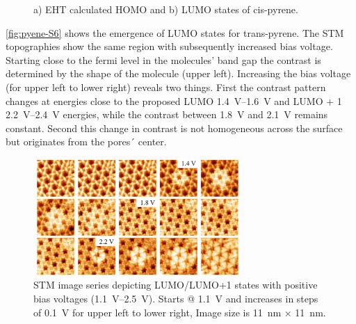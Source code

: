 \begin{figure}[]\centering
	\caption{a) EHT calculated HOMO and b) LUMO states of cis-pyrene.}
	\label{fig:pyene-S5}
\end{figure}

\autoref{fig:pyene-S6} shows the emergence of LUMO states for trans-pyrene. The STM topographies show the same region with subsequently increased bias voltage. Starting close to the fermi level in the molecules’ band gap the contrast is determined by the shape of the molecule (upper left). Increasing the bias voltage (for upper left to lower right) reveals two things. First the contrast pattern changes at energies close to the proposed LUMO \SIrange{1.4}{1.6}{\volt} and LUMO + 1 \SIrange{2.2}{2.4}{\volt} energies, while the contrast between \SI{1.8}{\volt} and \SI{2.1}{\volt} remains constant. Second this change in contrast is not homogeneous across the surface but originates from the pores´ center.

\begin{figure}[]\centering
	\includegraphics[width=0.7\textwidth]{./images/paper/pyrene/figure-S6}
	\caption{STM image series depicting LUMO/LUMO+1 states with positive bias voltages (\SIrange{1.1}{2.5}{\volt}). Starts @ \SI{1.1}{\volt} and increases in steps of \SI{0.1}{\volt} for upper left to lower right, Image size is \SI{11}{\nano \meter} $\times$ \SI{11}{\nano \meter}.}
	\label{fig:pyene-S6}
\end{figure}

